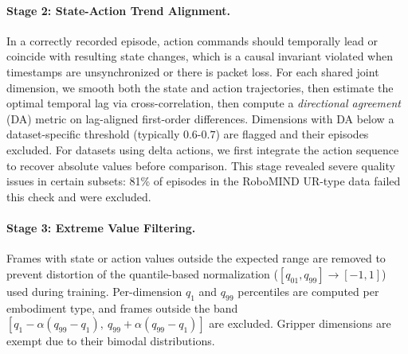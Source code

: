 \paragraph{Stage 2: State-Action Trend Alignment.}
In a correctly recorded episode, action commands should temporally lead or coincide with resulting state changes, which is a causal invariant violated when timestamps are unsynchronized or there is packet loss. 
For each shared joint dimension, we smooth both the state and action trajectories, then estimate the optimal temporal lag via cross-correlation, then compute a \emph{directional agreement} (DA) metric on lag-aligned first-order differences. 
Dimensions with DA below a dataset-specific threshold (typically $0.6$-$0.7$) are flagged and their episodes excluded. For datasets using delta actions, we first integrate the action sequence to recover absolute values before comparison. This stage revealed severe quality issues in certain subsets: 81\% of episodes in the RoboMIND UR-type data failed this check and were excluded.


\paragraph{Stage 3: Extreme Value Filtering.}
Frames with state or action values outside the expected range are removed to prevent distortion of the quantile-based normalization ($[q_{01}, q_{99}] \to [-1, 1]$) used during training. Per-dimension $q_1$ and $q_{99}$ percentiles are computed per embodiment type, and frames outside the band $[q_1 - \alpha(q_{99}-q_1),\ q_{99}+\alpha(q_{99}-q_1)]$ are excluded. Gripper dimensions are exempt due to their bimodal distributions.

